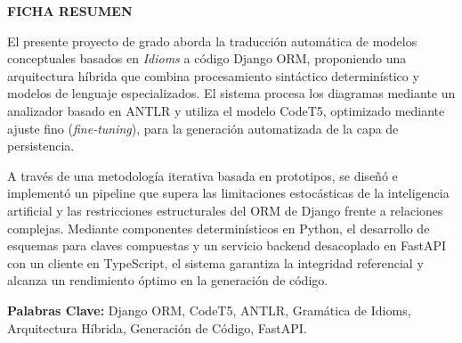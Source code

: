 \cleardoublepage
\thispagestyle{plain}

\begin{center}
    {\Large \bfseries FICHA RESUMEN}
\end{center}

\vspace{0.3cm}

\noindent El presente proyecto de grado aborda la traducción automática de modelos conceptuales basados en \textit{Idioms} a código Django ORM, proponiendo una arquitectura híbrida que combina procesamiento sintáctico determinístico y modelos de lenguaje especializados. El sistema procesa los diagramas mediante un analizador basado en ANTLR y utiliza el modelo CodeT5, optimizado mediante ajuste fino (\textit{fine-tuning}), para la generación automatizada de la capa de persistencia.

\vspace{0.3cm}

\noindent A través de una metodología iterativa basada en prototipos, se diseñó e implementó un pipeline que supera las limitaciones estocásticas de la inteligencia artificial y las restricciones estructurales del ORM de Django frente a relaciones complejas. Mediante componentes determinísticos en Python, el desarrollo de esquemas para claves compuestas y un servicio backend desacoplado en FastAPI con un cliente en TypeScript, el sistema garantiza la integridad referencial y alcanza un rendimiento óptimo en la generación de código.

\vspace{0.8cm}

\noindent \textbf{Palabras Clave:} Django ORM, CodeT5, ANTLR, Gramática de Idioms, Arquitectura Híbrida, Generación de Código, FastAPI.